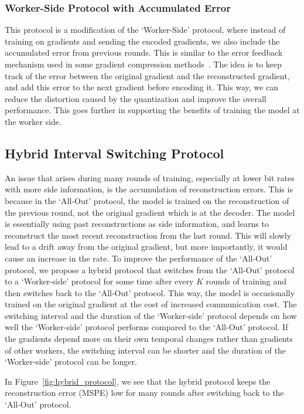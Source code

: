 \subsubsection{Worker-Side Protocol with Accumulated Error}
This protocol is a modification of the `Worker-Side' protocol, where instead of training on gradients and sending the encoded gradients, we also include the accumulated error from previous rounds. This is similar to the error feedback mechanism used in some gradient compression methods~\cite{Seide}. The idea is to keep track of the error between the original gradient and the reconstructed gradient, and add this error to the next gradient before encoding it. This way, we can reduce the distortion caused by the quantization and improve the overall performance. This goes further in supporting the benefits of training the model at the worker side.

\subsection{Hybrid Interval Switching Protocol}
An issue that arises during many rounds of training, especially at lower bit rates with more side information, is the accumulation of reconstruction errors.
This is because in the `All-Out' protocol, the model is trained on the reconstruction of the previous round, not the original gradient which is at the decoder. The model is essentially using past reconstructions as side information, and learns to reconstruct the most recent reconstruction from the last round. This will slowly lead to a drift away from the original gradient, but more importantly, it would cause an increase in the rate.
To improve the performance of the `All-Out' protocol, we propose a hybrid protocol that switches from the `All-Out' protocol to a `Worker-side' protocol for some time after every $K$ rounds of training and then switches back to the `All-Out' protocol. This way, the model is occasionally trained on the original gradient at the cost of increased communication cost. The switching interval and the duration of the `Worker-side' protocol depends on how well the `Worker-side' protocol performs compared to the `All-Out' protocol. If the gradients depend more on their own temporal changes rather than gradients of other workers, the switching interval can be shorter and the duration of the `Worker-side' protocol can be longer.

In Figure~\ref{fig:hybrid_protocol}, we see that the hybrid protocol keeps the reconstruction error (MSPE) low for many rounds after switching back to the `All-Out' protocol.

